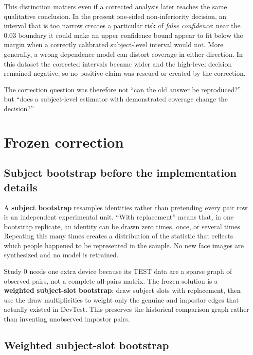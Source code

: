 \documentclass[10pt,a4paper]{article}
\begin{document}
This distinction matters even if a corrected analysis later reaches the same qualitative
conclusion. In the present one-sided non-inferiority decision, an interval that is too narrow
creates a particular risk of \emph{false confidence}: near the 0.03 boundary it could make
an upper confidence bound appear to fit below the margin when a correctly calibrated
subject-level interval would not. More generally, a wrong dependence model can distort
coverage in either direction. In this dataset the corrected intervals became wider and the
high-level decision remained negative, so no positive claim was rescued or created by the
correction.

The correction question was therefore not ``can the old answer be reproduced?'' but ``does
a subject-level estimator with demonstrated coverage change the decision?''

\section{Frozen correction}\label{sec:correction}

\subsection{Subject bootstrap before the implementation details}

A \textbf{subject bootstrap} resamples identities rather than pretending every pair row is an
independent experimental unit. ``With replacement'' means that, in one bootstrap replicate,
an identity can be drawn zero times, once, or several times. Repeating this many times creates
a distribution of the statistic that reflects which people happened to be represented in
the sample. No new face images are synthesized and no model is retrained.

Study 0 needs one extra device because its TEST data are a sparse graph of observed pairs,
not a complete all-pairs matrix. The frozen solution is a \textbf{weighted subject-slot
bootstrap}: draw subject slots with replacement, then use the draw multiplicities to weight
only the genuine and impostor edges that actually existed in DevTest. This preserves the
historical comparison graph rather than inventing unobserved impostor pairs.

\subsection{Weighted subject-slot bootstrap}
\end{document}
